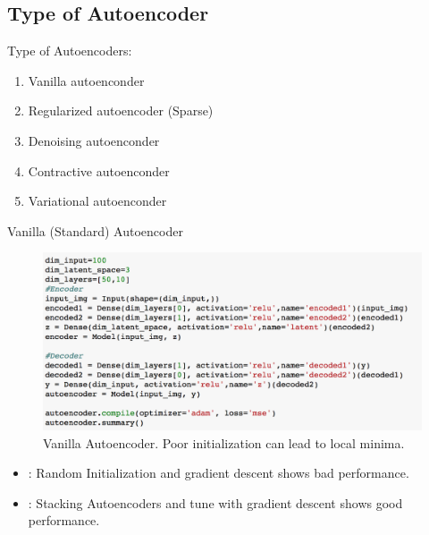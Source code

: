 \documentclass[handout,xcolor=pdftex,dvipsnames,table,mathserif]{beamer}
\begin{document}

\subsection{Type of Autoencoder}
\begin{frame}{Type of Autoencoders:}
\begin{enumerate}
\item Vanilla autoenconder
\item Regularized autoencoder (Sparse)
\item Denoising autoenconder
\item Contractive autoenconder
\item Variational autoenconder
\end{enumerate}
\end{frame}

\begin{frame}{Vanilla (Standard) Autoencoder}
\begin{figure}
\includegraphics[width=.8\columnwidth]{../graphics/StandardAutoencoder}
\caption{Vanilla Autoencoder.  Poor initialization can lead to local minima.}
\end{figure}
\begin{itemize}
\item \cite{rumelhart1986learning}: Random Initialization and gradient descent shows bad performance.
\item \cite{bengio2007greedy} \cite{vincent2010stacked}: Stacking Autoencoders and tune with gradient descent shows good performance.
\end{itemize}
\end{frame}
\end{document}
